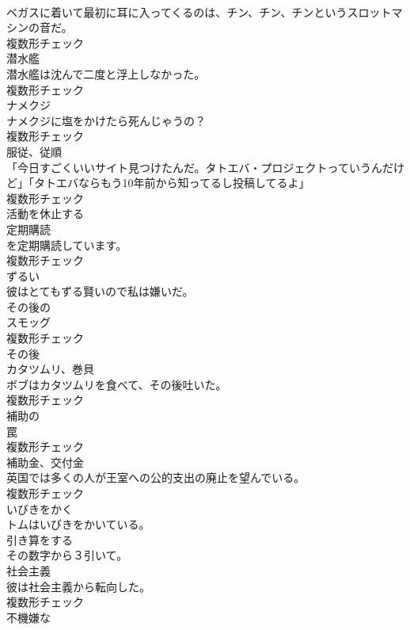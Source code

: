 \documentclass[8pt]{extreport}
\begin{document}
\begin{CJK}{UTF8}{min}
\\	ベガスに着いて最初に耳に入ってくるのは、チン、チン、チンというスロットマシンの音だ。	
\\	複数形チェック
\\	[名詞]	潜水艦	
\\	潜水艦は沈んで二度と浮上しなかった。	
\\	複数形チェック
\\	[名詞]	ナメクジ	
\\	ナメクジに塩をかけたら死んじゃうの？	
\\	複数形チェック
\\	[名詞]	服従、従順	
\\	「今日すごくいいサイト見つけたんだ。タトエバ・プロジェクトっていうんだけど」「タトエバならもう10年前から知ってるし投稿してるよ」	
\\	複数形チェック
\\	[動詞]	活動を休止する	
\\	[名詞]	定期購読	
\\	を定期購読しています。	
\\	複数形チェック
\\	[形容詞]	ずるい	
\\	彼はとてもずる賢いので私は嫌いだ。	
\\	[形容詞]	その後の	
\\	[名詞]	スモッグ	
\\	複数形チェック
\\	[副詞]	その後	
\\	[名詞]	カタツムリ、巻貝	
\\	ボブはカタツムリを食べて、その後吐いた。	
\\	複数形チェック
\\	[形容詞]	補助の	
\\	[名詞]	罠	
\\	複数形チェック
\\	[名詞]	補助金、交付金	
\\	英国では多くの人が王室への公的支出の廃止を望んでいる。	
\\	複数形チェック
\\	[動詞]	いびきをかく	
\\	トムはいびきをかいている。	
\\	[動詞]	引き算をする	
\\	その数字から３引いて。	
\\	[名詞]	社会主義	
\\	彼は社会主義から転向した。	
\\	複数形チェック
\\	[形容詞]	不機嫌な	

\end{CJK}
\end{document}
